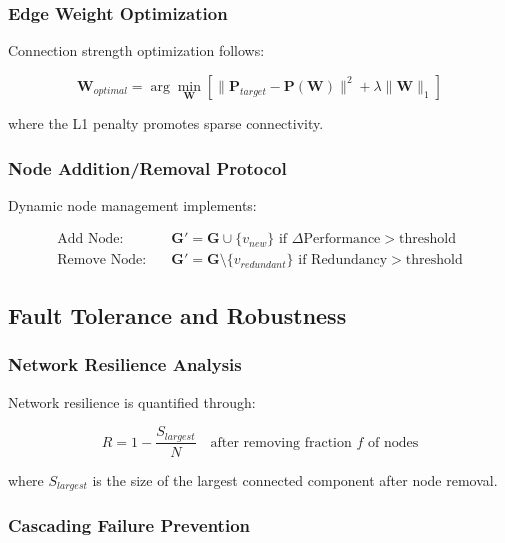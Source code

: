 \subsubsection{Edge Weight Optimization}

Connection strength optimization follows:

\begin{equation}
\mathbf{W}_{optimal} = \arg\min_{\mathbf{W}} \left[ \|\mathbf{P}_{target} - \mathbf{P}(\mathbf{W})\|^2 + \lambda \|\mathbf{W}\|_1 \right]
\end{equation}

where the L1 penalty promotes sparse connectivity.

\subsubsection{Node Addition/Removal Protocol}

Dynamic node management implements:

\begin{align}
\text{Add Node}: &\quad \mathbf{G}' = \mathbf{G} \cup \{v_{new}\} \text{ if } \Delta \text{Performance} > \text{threshold} \\
\text{Remove Node}: &\quad \mathbf{G}' = \mathbf{G} \setminus \{v_{redundant}\} \text{ if } \text{Redundancy} > \text{threshold}
\end{align}

\subsection{Fault Tolerance and Robustness}

\subsubsection{Network Resilience Analysis}

Network resilience is quantified through:

\begin{equation}
R = 1 - \frac{S_{largest}}{N} \quad \text{after removing fraction } f \text{ of nodes}
\end{equation}

where $S_{largest}$ is the size of the largest connected component after node removal.

\subsubsection{Cascading Failure Prevention}

